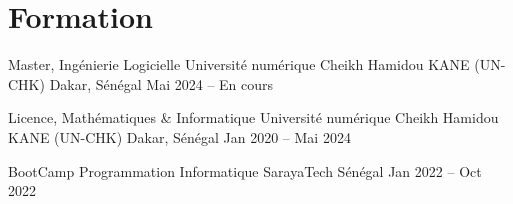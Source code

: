 \section{Formation}

\resumeSubheading
    {Master, Ing\'enierie Logicielle}
    {Universit\'e num\'erique Cheikh Hamidou KANE (UN-CHK)}
    {Dakar, S\'en\'egal}
    {Mai 2024 -- En cours}

\vspace{1pt}

\resumeSubheading
    {Licence, Math\'ematiques \& Informatique}
    {Universit\'e num\'erique Cheikh Hamidou KANE (UN-CHK)}
    {Dakar, S\'en\'egal}
    {Jan 2020 -- Mai 2024}

\vspace{1pt}

\resumeSubheading
    {BootCamp Programmation Informatique}
    {SarayaTech}
    {S\'en\'egal}
    {Jan 2022 -- Oct 2022}

